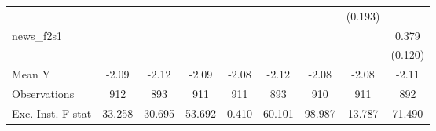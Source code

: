 {\begin{tabular}{l*{8}{c}}
            &                     &                     &                     &                     &                     &                     &     (0.193)         &                     \\
\addlinespace
news\_f2s1   &                     &                     &                     &                     &                     &                     &                     &       0.379\sym{***}\\
            &                     &                     &                     &                     &                     &                     &                     &     (0.120)         \\
\midrule
Mean Y      &       -2.09         &       -2.12         &       -2.09         &       -2.08         &       -2.12         &       -2.08         &       -2.08         &       -2.11         \\
Observations&         912         &         893         &         911         &         911         &         893         &         910         &         911         &         892         \\
Exc. Inst. F-stat&      33.258         &      30.695         &      53.692         &       0.410         &      60.101         &      98.987         &      13.787         &      71.490         \\
\bottomrule
\end{tabular}
}
